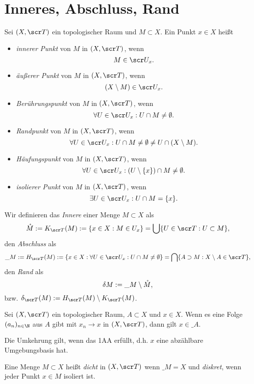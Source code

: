 \section{Inneres, Abschluss, Rand}


Sei $(X, \scr T)$ ein topologischer Raum und $M \subset X$.
Ein Punkt $x \in X$ heißt
\begin{itemize}
	\item
		\emph{innerer Punkt} von $M$ in $(X,\scr T)$, wenn
		\[
			M \in \scr U_x.
		\]
	\item
		\emph{äußerer Punkt} von $M$ in $(X,\scr T)$, wenn
		\[
			(X \setminus M) \in \scr U_x.
		\]
	\item
		\emph{Berührungspunkt} von $M$ in $(X, \scr T)$, wenn
		\[
			\forall U \in \scr U_x : U \cap M \neq \emptyset.
		\]
	\item
		\emph{Randpunkt} von $M$ in $(X, \scr T)$, wenn
		\[
			\forall U \in \scr U_x : U \cap M \neq \emptyset \neq U \cap (X \setminus M).
		\]
	\item
		\emph{Häufungspunkt} von $M$ in $(X, \scr T)$, wenn
		\[
			\forall U \in \scr U_x : (U \setminus \{x\}) \cap M \neq \emptyset.
		\]
	\item
		\emph{isolierer Punkt} von $M$ in $(X, \scr T)$, wenn
		\[
			\exists U \in \scr U_x : U \cap M = \{x\}.
		\]
\end{itemize}

\begin{df}
	Wir definieren das \emph{Innere} einer Menge $M \subset X$ als
	\[
		\mathring M
		:= K_{\scr T}(M)
		:= \{ x \in X : M \in U_x \}
		= \bigcup \{ U \in \scr T : U \subset M \},
	\]
	den \emph{Abschluss} als
	\[
		\_{M}
		:= H_{\scr T}(M)
		:= \{ x \in X : \forall U \in \scr U_x : U \cap M \neq \emptyset \}
		= \bigcap \{ A \supset M : X \setminus A \in \scr T \},
	\]
	den \emph{Rand} als
	\[
		\delta M
		:= \_ M \setminus \mathring M,
	\]
	bzw. $\delta_{\scr T}(M) := H_{\scr T}(M) \setminus K_{\scr T}(M)$.
\end{df}

\begin{st}
	Sei $(X, \scr T)$ ein topologischer Raum, $A \subset X$ und $x \in X$.
	Wenn es eine Folge $(a_n)_{n\in\N}$ aus $A$ gibt mit $x_n \to x$ in $(X, \scr T)$, dann gilt $x \in \_A$.

	Die Umkehrung gilt, wenn das 1AA erfüllt, d.h. $x$ eine abzählbare Umgebungsbasis hat.
\end{st}

\begin{df}
	Eine Menge $M \subset X$ heißt \emph{dicht} in $(X, \scr T)$ wenn $\_M = X$ und \emph{diskret}, wenn jeder Punkt $x \in M$ isoliert ist.
\end{df}

